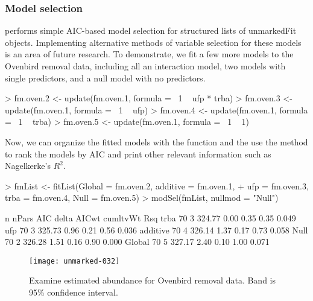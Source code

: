 \documentclass[article,shortnames]{jss}
\begin{document}

\subsubsection{Model selection}

 performs simple AIC-based model selection for
structured lists of unmarkedFit objects.  Implementing alternative
methods of variable selection for these models is an area of future
research.  To demonstrate, we fit a few more models to the Ovenbird
removal data, including all an interaction model, two models with
single predictors, and a null model with no predictors.

\begin{Schunk}
\begin{Sinput}
> fm.oven.2 <- update(fm.oven.1, formula = ~1 ~ ufp * trba)
> fm.oven.3 <- update(fm.oven.1, formula = ~1 ~ ufp)
> fm.oven.4 <- update(fm.oven.1, formula = ~1 ~ trba)
> fm.oven.5 <- update(fm.oven.1, formula = ~1 ~ 1)
\end{Sinput}
\end{Schunk}


Now, we can organize the fitted models with the  function and
the use the  method to rank the models by AIC and print
other relevant information such as Nagelkerke's
\citeyearpar{Nagelkerke1991} $R^{2}$.



\begin{Schunk}
\begin{Sinput}
> fmList <- fitList(Global = fm.oven.2, additive = fm.oven.1, 
+     ufp = fm.oven.3, trba = fm.oven.4, Null = fm.oven.5)
> modSel(fmList, nullmod = "Null")
\end{Sinput}
\begin{Soutput}
          n nPars    AIC delta AICwt cumltvWt   Rsq
trba     70     3 324.77  0.00  0.35     0.35 0.049
ufp      70     3 325.73  0.96  0.21     0.56 0.036
additive 70     4 326.14  1.37  0.17     0.73 0.058
Null     70     2 326.28  1.51  0.16     0.90 0.000
Global   70     5 327.17  2.40  0.10     1.00 0.071
\end{Soutput}
\end{Schunk}


\begin{figure}[ht]
  \centering
\texttt{[image: unmarked-032]}
\caption{Examine estimated abundance for Ovenbird removal data.  Band
  is 95\% confidence interval.}
\label{fig:pred}
\end{figure}
\end{document}
